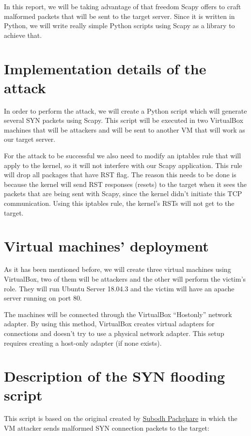 \documentclass[11pt]{article}
\begin{document}
In this report, we will be taking advantage of that freedom Scapy offers to craft malformed packets that will be sent to the target server. Since it is written in Python, we will write really simple Python scripts using Scapy as a library to achieve that.
\clearpage

\section{Implementation details of the attack}\index{}
In order to perform the attack, we will create a Python script which will generate several SYN packets using Scapy. This script will be executed in two VirtualBox machines that will be attackers and will be sent to another VM that will work as our target server.\vspace{5mm}

For the attack to be successful we also need to modify an iptables rule that will apply to the kernel, so it will not interfere with our Scapy application. This rule will drop all packages that have RST flag. The reason this needs to be done is because the kernel will send RST responses (resets) to the target when it sees the packets that are being sent with Scapy, since the kernel didn’t initiate this TCP communication. Using this iptables rule, the kernel’s RSTs will not get to the target.\vspace{5mm}

\section{Virtual machines' deployment}\index{}
As it has been mentioned before, we will create three virtual machines using VirtualBox, two of them will be attackers and the other will perform the victim's role. They will run Ubuntu Server 18.04.3 and the victim will have an apache server running on port 80.\vspace{5mm}

The machines will be connected through the VirtualBox “Hostonly” network adapter. By using this method, VirtualBox creates virtual adapters for connections and doesn't try to use a physical network adapter. This setup requires creating a host-only adapter (if none exists).

\section{Description of the SYN flooding script}\index{}
This script is based on the original created by \href{https://github.com/subodhp}{Subodh Pachghare} in which the VM attacker sends malformed SYN connection packets to the target:\vspace{5mm}
\end{document}
